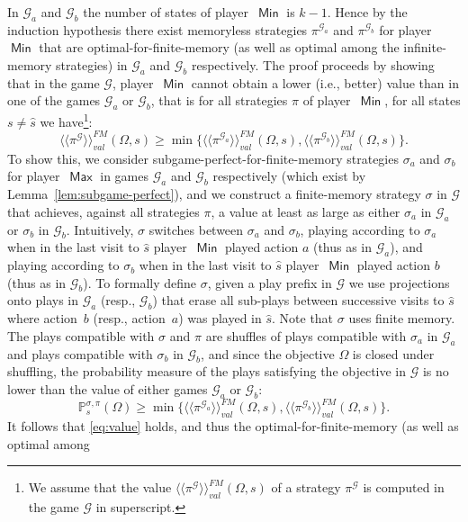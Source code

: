 \documentclass{article}
\newcommand{\GG}{\mathcal{G}}
\newcommand{\winval}[1]{\langle \! \langle #1 \rangle\! \rangle_{\mathit{val}} }
\newcommand{\mystravaf}[1]{\winval{#1}^{{FM}}}
\newcommand{\straa}{\sigma}
\newcommand{\strab}{\pi}
\DeclareMathOperator{\ma}{\mathsf{Max}}
\DeclareMathOperator{\mi}{\mathsf{Min}}
\newcommand{\prob}[1]{\mathbb{P}_{#1}}
\begin{document}
\smallskip{}
In $\GG_a$ and $\GG_b$ the number of states of player~$\mi$ is $k-1$. 
Hence by the induction hypothesis there exist memoryless strategies $\strab^{\GG_a}$ and $\strab^{\GG_b}$
for player~$\mi$ that are optimal-for-finite-memory (as well as optimal among the infinite-memory strategies) 
in $\GG_a$ and $\GG_b$ respectively.
The proof proceeds by showing that in the game $\GG$, player~$\mi$ cannot obtain
a lower (i.e., better) value than in one of the games $\GG_a$ or $\GG_b$,
that is for all strategies $\strab$ of player~$\mi$, for all states $s \neq \hat{s}$
we have\footnote{We assume that the value $\mystravaf{\strab^{\GG}}(\Omega,s)$ of 
a strategy $\strab^{\GG}$ is computed in the game $\GG$ in superscript.}:
\begin{equation}
\mystravaf{\strab^{\GG}}(\Omega,s)\!\geq\!\min \big\{\mystravaf{\strab^{\GG_a}}(\Omega,s),\mystravaf{\strab^{\GG_b}}(\Omega,s)\big\}.
\label{eq:value}
\end{equation}
To show this, we consider subgame-perfect-for-finite-memory strategies $\straa_a$ and $\straa_b$ 
for player~$\ma$ in games $\GG_a$ and $\GG_b$ respectively (which exist by Lemma~\ref{lem:subgame-perfect}), 
and we construct
a finite-memory strategy $\straa$ in $\GG$ that achieves, against all strategies 
$\strab$, a value at least as large as either $\straa_a$ in $\GG_a$ or $\straa_b$ 
in $\GG_b$. Intuitively, $\straa$ switches between $\straa_a$ and $\straa_b$, 
playing according to $\straa_a$ when in the last visit to $\hat{s}$ player~$\mi$ 
played action $a$ (thus as in $\GG_a$),
and playing according to $\straa_b$ when in the last visit to $\hat{s}$ player~$\mi$ 
played action $b$ (thus as in $\GG_b$). 
To formally define $\straa$, given a play prefix in $\GG$ we use projections 
onto plays in $\GG_a$ (resp., $\GG_b$) that erase all sub-plays between
successive visits to $\hat{s}$ where action~$b$ (resp., action~$a$) was played in $\hat{s}$.
Note that $\straa$ uses finite memory.
The plays compatible with $\straa$ and $\strab$ are shuffles of plays compatible 
with $\straa_a$ in $\GG_a$ and plays compatible with $\straa_b$ in $\GG_b$,
and since the objective $\Omega$ is closed under shuffling, the probability
measure of the plays satisfying the objective in $\GG$ is no lower than
the value of either games $\GG_a$ or $\GG_b$:
$$\prob{s}^{\straa,\strab}(\Omega) \geq \min \big\{\mystravaf{\strab^{\GG_a}}(\Omega,s),\mystravaf{\strab^{\GG_b}}(\Omega,s)\big\}.$$
It follows that \eqref{eq:value} holds, and thus the optimal-for-finite-memory (as well as optimal among 
\end{document}
